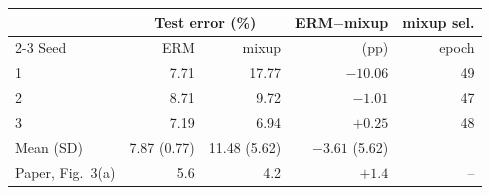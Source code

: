 \begin{tabular}{@{}lrrrr@{}}
\toprule
& \multicolumn{2}{c}{Test error (\%)} & ERM$-$mixup & mixup sel.\\
\cmidrule(lr){2-3}
Seed & ERM & mixup & (pp) & epoch\\
\midrule
1 & 7.71 & 17.77 & $-10.06$ & 49\\
2 & 8.71 & 9.72 & $-1.01$ & 47\\
3 & 7.19 & 6.94 & $+0.25$ & 48\\
\midrule
Mean (SD) & 7.87 (0.77) & 11.48 (5.62) & $-3.61$ (5.62) & \\
Paper, Fig.~3(a) & 5.6 & 4.2 & $+1.4$ & --\\
\bottomrule
\end{tabular}
